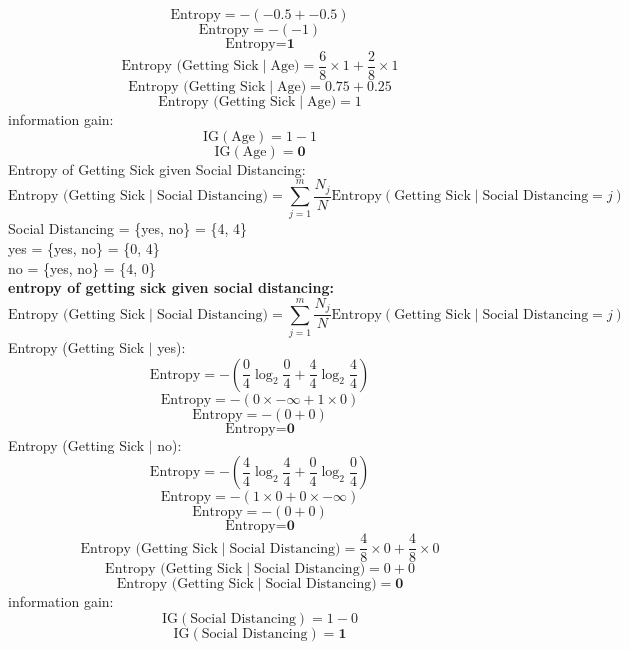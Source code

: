 \documentclass[a3paper,12pt]{extarticle} %
\begin{document}
\begin{enumerate}
\[        \text{Entropy} = -\left(-0.5 + -0.5\right)
        \]
        \[
        \text{Entropy} = -\left(-1\right)
        \]
        \[
        \text{Entropy} = \textbf{1}
        \]
        \[
        \text{Entropy (Getting Sick} \mid \text{Age)} = \frac{6}{8} \times 1 + \frac{2}{8} \times 1
        \]
        \[
        \text{Entropy (Getting Sick} \mid \text{Age)} = 0.75 + 0.25
        \]
        \[
        \text{Entropy (Getting Sick} \mid \text{Age)} = 1
        \]
        information gain:
        \[
        \text{IG}(\text{Age}) = 1 - 1
        \]
        \[
        \text{IG}(\text{Age}) = \textbf{0}
        \]
        Entropy of Getting Sick given Social Distancing:
        \[
        \text{Entropy (Getting Sick} \mid \text{Social Distancing)} = \sum_{j=1}^m \frac{N_j}{N} \text{Entropy}(\text{Getting Sick} \mid \text{Social Distancing} = j)
        \]
        Social Distancing = \{yes, no\} = \{4, 4\}
        \\ yes = \{yes, no\} = \{0, 4\}
        \\ no = \{yes, no\} = \{4, 0\}
        \\ \textbf{entropy of getting sick given social distancing:}
        \[
        \text{Entropy (Getting Sick} \mid \text{Social Distancing)} = \sum_{j=1}^m \frac{N_j}{N} \text{Entropy}(\text{Getting Sick} \mid \text{Social Distancing} = j)
        \]
        Entropy (Getting Sick $\mid$ yes):
        \[
        \text{Entropy} = -\left(\frac{0}{4} \log_2 \frac{0}{4} + \frac{4}{4} \log_2 \frac{4}{4}\right)
        \]
        \[
        \text{Entropy} = -\left(0 \times -\infty + 1 \times 0\right)
        \]
        \[
        \text{Entropy} = -\left(0 + 0\right)
        \]
        \[
        \text{Entropy} = \textbf{0}
        \]
        Entropy (Getting Sick $\mid$ no):
        \[
        \text{Entropy} = -\left(\frac{4}{4} \log_2 \frac{4}{4} + \frac{0}{4} \log_2 \frac{0}{4}\right)
        \]
        \[
        \text{Entropy} = -\left(1 \times 0 + 0 \times -\infty\right)
        \]
        \[
        \text{Entropy} = -\left(0 + 0\right)
        \]
        \[
        \text{Entropy} = \textbf{0}
        \]
        \[
        \text{Entropy (Getting Sick} \mid \text{Social Distancing)} = \frac{4}{8} \times 0 + \frac{4}{8} \times 0
        \]
        \[
        \text{Entropy (Getting Sick} \mid \text{Social Distancing)} = 0 + 0
        \]
        \[
        \text{Entropy (Getting Sick} \mid \text{Social Distancing)} = \textbf{0}
        \]
        information gain:
        \[
        \text{IG}(\text{Social Distancing}) = 1 - 0
        \]
        \[
        \text{IG}(\text{Social Distancing}) = \textbf{1}
\]
\end{enumerate}
\end{document}

